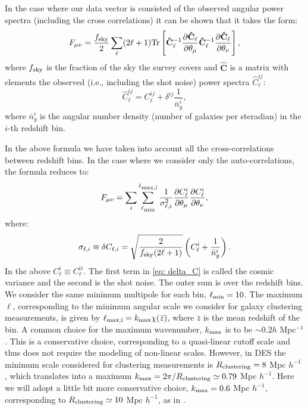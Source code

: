 \documentclass[a4paper,fleqn,usenatbib]{mnras}
\begin{document}
In the case where our data vector is consisted of the observed angular power spectra (including the cross correlations) it can be shown that it takes the form:
\begin{equation}
F_{\mu \nu} = \frac{f_{\mbox{\scriptsize{sky}}}}{2} \sum_{\ell} (2\ell + 1)\mbox{Tr}\left[\mathbf{\hat{C}}_\ell^{-1} \frac{\partial \mathbf{\hat{C}}_{\ell}}{\partial \theta_\mu} \mathbf{\hat{C}}_\ell^{-1} \frac{\partial \mathbf{\hat{C}}_{\ell}}{\partial \theta_\nu} \right],
\end{equation}
where $f_{\mbox{\scriptsize{sky}}}$ is the fraction of the sky the survey covers and  $\mathbf{\hat{C}}$ is a matrix with elements the observed (i.e., including the shot noise) power spectra $\hat{C}_\ell^{ij}$:
\begin{equation}
\hat{C}_\ell^{ij} = C_\ell^{ij} + \delta^{ij}\frac{1}{\bar{n}_g^i},
\end{equation}
where $\bar{n}_g^i$ is the angular number density (number of galaxies per steradian) in the $i$-th redshift bin.

In the above formula we have taken into account all the cross-correlations between redshift bins. In the case where we consider only the auto-correlations, the formula reduces to:
\begin{equation}
F_{\mu \nu} = \sum_i \sum_{\ell_{\mbox{\scriptsize{{min}}}}}^{\ell_{\mbox{\scriptsize{{max,i}}}}} \frac{1}{\sigma^2_{\ell,i}}\frac{\partial C_\ell^{i}}{\partial \theta_\mu} \frac{\partial C_\ell^{i}}{\partial \theta_\nu},
\end{equation}
where:
\begin{equation}
\label{eq: delta_C}
\sigma_{\ell,i} \equiv 
\delta C_{\ell,i} = \sqrt{\frac{2}{f_{\mbox{\scriptsize{sky}}}(2\ell + 1)}}\left(C_\ell^{i} + \frac{1}{\bar{n}_g^i} \right).
\end{equation}
In the above $C_\ell^i \equiv C_\ell^{ii}$.  The first term in \eqref{eq: delta_C} is called the cosmic variance and the second is the shot noise. The outer sum is over the redshift bins. We consider the same minimum multipole for each bin, $\ell_{\mbox{\scriptsize{min}}} = 10$. The maximum $\ell$, corresponding to the minimum angular scale we consider for galaxy clustering measurements, is given by $\ell_{\mbox{\scriptsize{max,i}}} = k_{\mbox{\scriptsize{max}}}\chi(\bar{z})$, where $\bar{z}$ is the mean redshift of the bin. A common choice for the maximum  wavenumber, $k_{\mbox{\scriptsize{max}}}$ is to be $\sim 0.2 h$ Mpc$^{-1}$. This is a conservative choice, corresponding to a quasi-linear cutoff scale and thus does not require the modeling of non-linear scales. However, in DES the minimum scale considered for clustering measurements is $R_{\mbox{\scriptsize{clustering}}} = 8$ Mpc $h^{-1}$ \citep{Krause2017}, which translates into a maximum $k_{\mbox{\scriptsize{max}}} = 2\pi/R_{\mbox{\scriptsize{clustering}}} \simeq 0.79 $ Mpc $h^{-1}$. Here we will adopt a little bit more conservative choice,  $k_{\mbox{\scriptsize{max}}} = 0.6$ Mpc $h^{-1}$, corresponding to $R_{\mbox{\scriptsize{clustering}}} \simeq 10$ Mpc $h^{-1}$, as in \citealt{Krause2017a}. 
\end{document}
